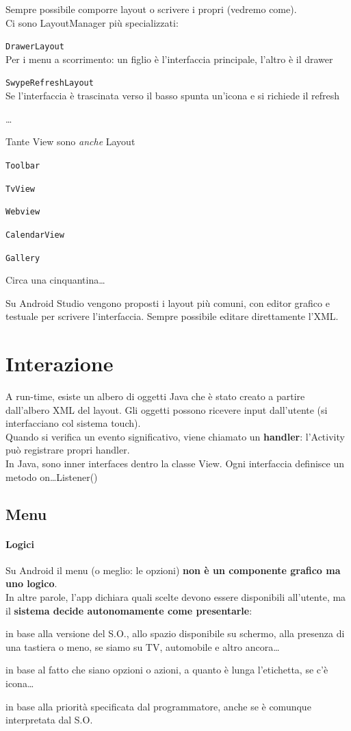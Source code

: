 \documentclass[10pt]{book}
\begin{document}
Sempre possibile comporre layout o scrivere i propri (vedremo come).\\
Ci sono LayoutManager più specializzati:
\begin{list}{}{}
	\item \texttt{DrawerLayout}\\
	Per i menu a scorrimento: un figlio è l'interfaccia principale, l'altro è il drawer
	\item \texttt{SwypeRefreshLayout}\\
	Se l'interfaccia è trascinata verso il basso spunta un'icona e si richiede il refresh
	\item \ldots
\end{list}
Tante View sono \textit{anche} Layout
\begin{list}{}{}
	\item \texttt{Toolbar}
	\item \texttt{TvView}
	\item \texttt{Webview}
	\item \texttt{CalendarView}
	\item \texttt{Gallery}
	\item Circa una cinquantina\ldots
\end{list}
Su Android Studio vengono proposti i layout più comuni, con editor grafico e testuale per scrivere l'interfaccia. Sempre possibile editare direttamente l'XML.
\section{Interazione}
A run-time, esiste un albero di oggetti Java che è stato creato a partire dall'albero XML del layout. Gli oggetti possono ricevere input dall'utente (si interfacciano col sistema touch).\\
Quando si verifica un evento significativo, viene chiamato un \textbf{handler}: l'Activity può registrare propri handler.\\
In Java, sono inner interfaces dentro la classe View. Ogni interfaccia definisce un metodo on\ldots Listener()
\subsection{Menu}
\paragraph{Logici} Su Android il menu (o meglio: le opzioni) \textbf{non è un componente grafico ma uno logico}.\\
In altre parole, l'app dichiara quali scelte devono essere disponibili all'utente, ma il \textbf{sistema decide autonomamente come presentarle}:
\begin{list}{}{}
	\item in base alla versione del S.O., allo spazio disponibile su schermo, alla presenza di una tastiera o meno, se siamo su TV, automobile e altro ancora\ldots
	\item in base al fatto che siano opzioni o azioni, a quanto è lunga l'etichetta, se c'è icona\ldots
	\item in base alla priorità specificata dal programmatore, anche se è comunque interpretata dal S.O.
\end{list}
\end{document}
